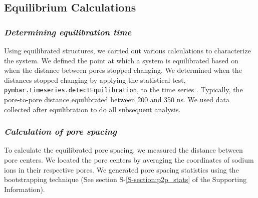 \documentclass[journal=jpcbfk,manuscript=article]{achemso}
\begin{document}
  \subsection{Equilibrium Calculations}

  \subsubsection{\textit{Determining equilibration time}}\label{method:equil_time}

  Using equilibrated structures, we carried out various calculations to
  characterize the system. We defined the point at which a system is equilibrated
  based on when the distance between pores stopped changing.  We determined when
  the distances stopped changing by applying the statistical test,
  \texttt{pymbar.timeseries.detectEquilibration}, to the time series
  \cite{chodera_simple_2016,shirts_statistically_2008}. Typically, the pore-to-pore
  distance equilibrated between 200 and 350 ns. We used data collected after 
  equilibration to do all subsequent analysis.

  \subsubsection{\textit{Calculation of pore spacing}}\label{method:pore_spacing}

  To calculate the equilibrated pore spacing, we measured the distance between
  pore centers. We located the pore centers by averaging the coordinates of sodium
  ions in their respective pores. We generated pore spacing statistics 
  using the bootstrapping technique (See section S-\ref{S-section:p2p_stats} of the
  Supporting Information).
\end{document}
